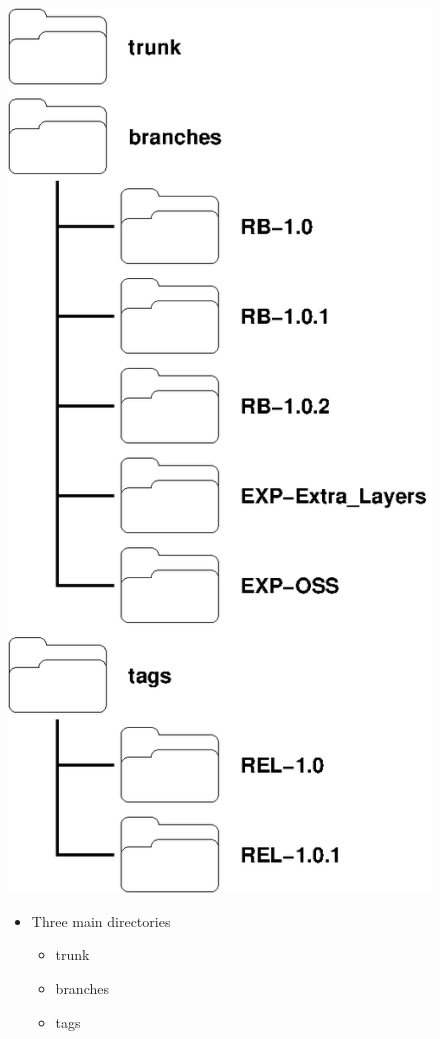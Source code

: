 \begin{figure}[htp]
\begin{minipage}[t]{.475\textwidth}
\begin{center}
      \includegraphics[scale=0.8]{graphics/CRTM_Repository_Structure.eps}
    \end{center}
  \end{minipage}
  \hfill
  \begin{minipage}[b]{.475\textwidth}
    \begin{itemize}
      \item Three main directories
        \begin{itemize}
          \item trunk
          \item branches
          \item tags
        \end{itemize}


\end{itemize}
\end{minipage}
\end{figure}
